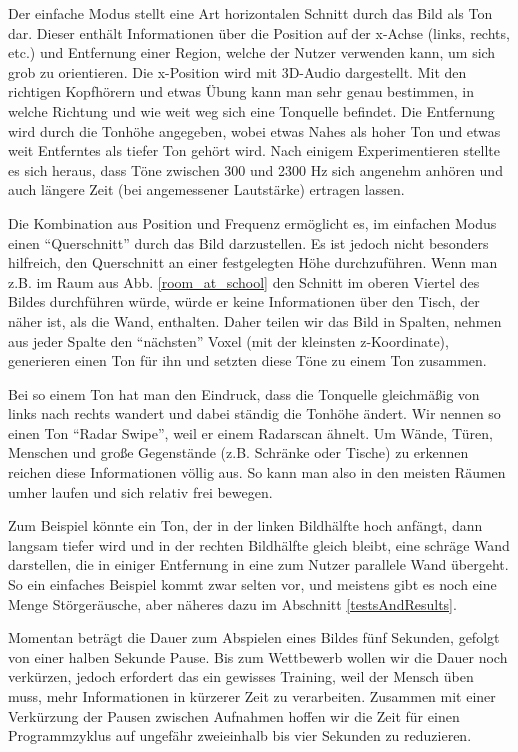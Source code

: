 \documentclass[a4paper,12pt,ngerman]{scrartcl}
\begin{document}
Der einfache Modus stellt eine Art horizontalen Schnitt durch das Bild als Ton dar. Dieser enthält Informationen
über die Position auf der x-Achse (links, rechts, etc.) und Entfernung einer Region, welche der Nutzer verwenden kann,
um sich grob zu orientieren. Die x-Position wird mit 3D-Audio dargestellt. Mit den richtigen Kopfhörern und etwas Übung
kann man sehr genau bestimmen, in welche Richtung und wie weit weg sich eine Tonquelle befindet. Die Entfernung wird
durch die Tonhöhe angegeben, wobei etwas Nahes als hoher Ton und etwas weit Entferntes als tiefer Ton gehört wird.
Nach einigem Experimentieren stellte es sich heraus, dass Töne zwischen 300 und 2300 Hz sich angenehm anhören und auch
längere Zeit (bei angemessener Lautstärke) ertragen lassen. \par 
Die Kombination aus Position und Frequenz ermöglicht es, im
einfachen Modus einen \enquote{Querschnitt} durch das Bild darzustellen. Es ist jedoch nicht besonders hilfreich, 
den Querschnitt an einer festgelegten Höhe durchzuführen. Wenn man z.B. im Raum aus Abb. \ref{room_at_school} den Schnitt im oberen Viertel des Bildes durchführen würde, würde er keine Informationen über den Tisch, der näher ist, als
die Wand, enthalten. Daher teilen wir das Bild in Spalten, nehmen aus jeder Spalte den \enquote{nächsten} Voxel 
(mit der kleinsten z-Koordinate), generieren einen Ton für ihn und setzten diese Töne zu einem Ton zusammen. \par
Bei so einem Ton hat man den Eindruck, dass die Tonquelle gleichmäßig von links nach rechts wandert und dabei ständig
die Tonhöhe ändert. Wir nennen so einen Ton \enquote{Radar Swipe}, weil er einem Radarscan ähnelt.
Um Wände, Türen, Menschen und große Gegenstände (z.B. Schränke oder Tische) zu erkennen reichen diese Informationen völlig aus. So kann man also in den meisten Räumen umher laufen und sich relativ frei bewegen.\par
Zum Beispiel könnte ein Ton, der in der linken Bildhälfte hoch anfängt, dann langsam tiefer wird und 
in der rechten Bildhälfte gleich bleibt, eine schräge Wand darstellen, die in einiger Entfernung in eine
zum Nutzer parallele Wand übergeht. So ein einfaches Beispiel kommt zwar selten vor, und meistens gibt es
noch eine Menge Störgeräusche, aber näheres dazu im Abschnitt \ref{testsAndResults}.\par 
Momentan beträgt die Dauer zum Abspielen eines Bildes fünf Sekunden, gefolgt von einer halben Sekunde 
Pause. Bis zum Wettbewerb wollen wir die Dauer noch verkürzen, jedoch erfordert das ein gewisses 
Training, weil der Mensch üben muss, mehr Informationen in kürzerer Zeit zu verarbeiten. Zusammen mit 
einer Verkürzung der Pausen zwischen Aufnahmen hoffen wir die Zeit für einen Programmzyklus auf ungefähr
zweieinhalb bis vier Sekunden zu reduzieren. 
\end{document}
